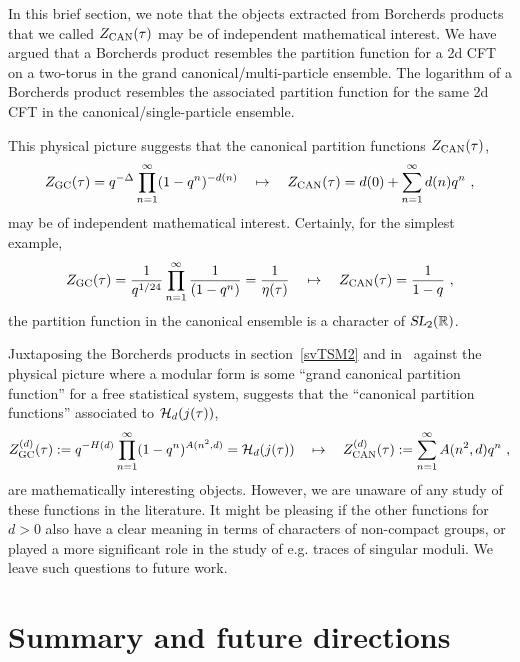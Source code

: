 \documentclass[11pt,a4paper]{article}
\def\R{\mathbb{R}}
\newcommand{\SL}{\operatorname{\textsl{SL}}}	 	%
\begin{document}
In this brief section, we note that the objects extracted from Borcherds products that we called $Z_{\rm CAN}(\tau)$ may be of independent mathematical interest. We have argued that a Borcherds product resembles the partition function for a 2d CFT on a two-torus in the grand canonical/multi-particle ensemble. The logarithm of a Borcherds product resembles the associated partition function for the same 2d CFT in the canonical/single-particle ensemble. 

This physical picture suggests that the canonical partition functions $Z_{\rm CAN}(\tau)$,
\begin{align}
Z_{\rm GC}(\tau) 
= q^{-\Delta} \prod_{n = 1}^{\infty}  (1-q^n)^{-d(n)}
\quad \mapsto \quad 
Z_{\rm CAN}(\tau) 
= d(0) + \sum_{n = 1}^{\infty} d(n) q^n 
~, \label{eqZmap1}
\end{align}
may be of independent mathematical interest. Certainly, for the simplest example,
\begin{align}
Z_{\rm GC}(\tau) = \frac{1}{q^{1/24}} \prod_{n = 1}^{\infty} \frac{1}{(1-q^n)} = \frac{1}{\eta(\tau)}
\quad \mapsto \quad 
Z_{\rm CAN}(\tau) = \frac{1}{1-q} 
~, \label{eqZmap0}
\end{align}
the partition function in the canonical ensemble is a character of $\SL_2(\R)$. 

Juxtaposing the Borcherds products in section~\ref{svTSM2} and in~\cite{02-TSM} against the physical picture where a modular form is some ``grand canonical partition function'' for a free statistical system, suggests that the ``canonical partition functions''  associated to ${\cal H}_d(j(\tau))$,
\begin{align}
Z_{\rm GC}^{(d)}(\tau):= q^{-H(d)} \prod_{n = 1}^{\infty} (1-q^n)^{A(n^2,d)} = {\cal H}_d(j(\tau)) 
\quad \mapsto \quad
Z_{\rm CAN}^{(d)}(\tau) := \sum_{n = 1}^{\infty} A(n^2,d) q^n ~,
\end{align}
are mathematically interesting objects. However, we are unaware of any study of these functions in the literature. It might be pleasing if the other functions for $d > 0$ also have a clear meaning in terms of characters of non-compact groups, or played a more significant role in the study of e.g. traces of singular moduli. We leave such questions to future work.



\section{Summary and future directions}\label{secEnd}
\end{document}

